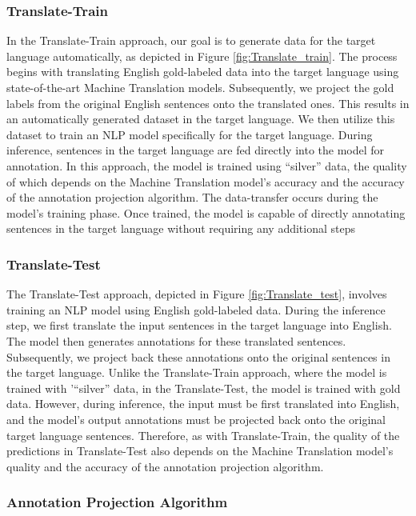\subsubsection{Translate-Train}
In the Translate-Train approach, our goal is to generate data for the target language automatically, as depicted in Figure \ref{fig:Translate_train}. The process begins with translating English gold-labeled data into the target language using state-of-the-art Machine Translation models. Subsequently, we project the gold labels from the original English sentences onto the translated ones. This results in an automatically generated dataset in the target language. We then utilize this dataset to train an NLP model specifically for the target language. During inference, sentences in the target language are fed directly into the model for annotation. In this approach, the model is trained using ``silver'' data, the quality of which depends on the Machine Translation model's accuracy and the accuracy of the annotation projection algorithm. The data-transfer occurs during the model's training phase. Once trained, the model is capable of directly annotating sentences in the target language without requiring any additional steps

\subsubsection{Translate-Test}
The Translate-Test approach, depicted in Figure \ref{fig:Translate_test}, involves training an NLP model using English gold-labeled data. During the inference step, we first translate the input sentences in the target language into English. The model then generates annotations for these translated sentences. Subsequently, we project back these annotations onto the original sentences in the target language. Unlike the Translate-Train approach, where the model is trained with '``silver'' data, in the Translate-Test, the model is trained with gold data. However, during inference, the input must be first translated into English, and the model's output annotations must be projected back onto the original target language sentences. Therefore, as with Translate-Train, the quality of the predictions in Translate-Test also depends on the Machine Translation model's quality and the accuracy of the annotation projection algorithm.




\subsubsection{Annotation Projection Algorithm}


